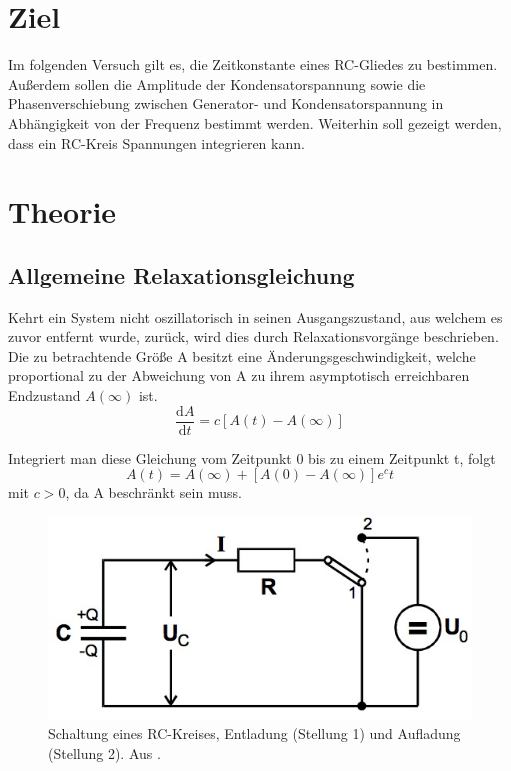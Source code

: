 \section{Ziel}
\label{sec:Ziel}
Im folgenden Versuch gilt es, die Zeitkonstante eines RC-Gliedes zu bestimmen. Außerdem sollen die Amplitude der Kondensatorspannung sowie die Phasenverschiebung zwischen Generator- und Kondensatorspannung in Abhängigkeit von der Frequenz bestimmt werden. Weiterhin soll gezeigt werden, dass ein RC-Kreis Spannungen integrieren kann.

\section{Theorie}
\label{sec:Theorie}
\subsection{Allgemeine Relaxationsgleichung}
Kehrt ein System nicht oszillatorisch in seinen Ausgangszustand, aus welchem es zuvor entfernt wurde, zurück, wird dies durch Relaxationsvorgänge beschrieben. Die zu betrachtende Größe A besitzt eine Änderungsgeschwindigkeit, welche proportional zu der Abweichung von A zu ihrem asymptotisch erreichbaren Endzustand $A(\infty)$ ist.
\begin{equation}
\label{eqn:dgl}
  \frac{\mathrm{d}A}{\mathrm{d}t} = c[A(t)-A(\infty)]
\end{equation}

Integriert man diese Gleichung vom Zeitpunkt 0 bis zu einem Zeitpunkt t, folgt
\begin{equation}
  A(t) = A(\infty) + [A(0) - A(\infty)]e^ct
\end{equation}
mit $c > 0$, da A beschränkt sein muss.

\begin{figure}
  \centering
  \includegraphics[scale=0.5]{content/RC-Kreis.jpg}
  \caption{Schaltung eines RC-Kreises, Entladung (Stellung 1) und Aufladung (Stellung 2). Aus \cite{anleitung353}.}
  \label{fig:rc-kreis}
\end{figure}

